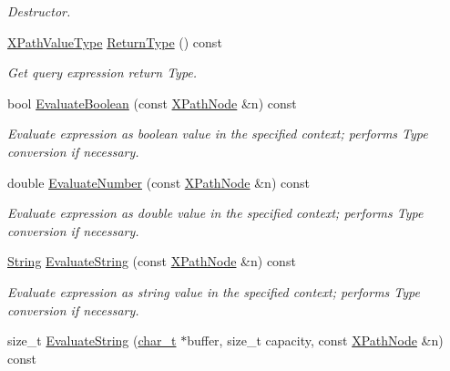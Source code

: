 \begin{DoxyCompactItemize}
\begin{DoxyCompactList}\small\item\em Destructor. \item\end{DoxyCompactList}\item 
\hyperlink{namespacephys_1_1xml_a339b9eef674ba44100110e5524bc575d}{XPathValueType} \hyperlink{classphys_1_1xml_1_1XPathQuery_af4c6025009b1e09cdf56124a047ca4f0}{ReturnType} () const 
\begin{DoxyCompactList}\small\item\em Get query expression return Type. \item\end{DoxyCompactList}\item 
bool \hyperlink{classphys_1_1xml_1_1XPathQuery_a44fed594a458aa4b6cf4f3d12d5089a8}{EvaluateBoolean} (const \hyperlink{classphys_1_1xml_1_1XPathNode}{XPathNode} \&n) const 
\begin{DoxyCompactList}\small\item\em Evaluate expression as boolean value in the specified context; performs Type conversion if necessary. \item\end{DoxyCompactList}\item 
double \hyperlink{classphys_1_1xml_1_1XPathQuery_aacfcff30901ce20b92de56ec0e2d70e5}{EvaluateNumber} (const \hyperlink{classphys_1_1xml_1_1XPathNode}{XPathNode} \&n) const 
\begin{DoxyCompactList}\small\item\em Evaluate expression as double value in the specified context; performs Type conversion if necessary. \item\end{DoxyCompactList}\item 
\hyperlink{namespacephys_1_1xml_a4d8ca7638328d16d303e5a4c849f4704}{String} \hyperlink{classphys_1_1xml_1_1XPathQuery_ab7084be2e608b38872167fe3321554b9}{EvaluateString} (const \hyperlink{classphys_1_1xml_1_1XPathNode}{XPathNode} \&n) const 
\begin{DoxyCompactList}\small\item\em Evaluate expression as string value in the specified context; performs Type conversion if necessary. \item\end{DoxyCompactList}\item 
size\_\-t \hyperlink{classphys_1_1xml_1_1XPathQuery_ac9f4705c639cbd7f3aef8266fa683cc2}{EvaluateString} (\hyperlink{namespacephys_1_1xml_afc87705cd1c2917d87b879715a2d8f6e}{char\_\-t} $\ast$buffer, size\_\-t capacity, const \hyperlink{classphys_1_1xml_1_1XPathNode}{XPathNode} \&n) const 

\end{DoxyCompactItemize}
